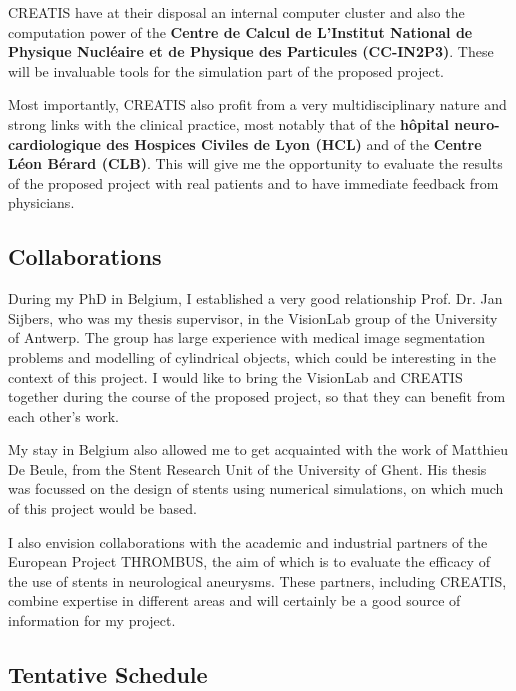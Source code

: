 \documentclass[a4paper]{article}
\begin{document}
CREATIS have at their disposal an internal computer cluster and also the computation power of the {\bf Centre de Calcul de L'Institut National de Physique Nucléaire et de Physique des Particules (CC-IN2P3)}. These will be invaluable tools for the simulation part of the proposed project. 

Most importantly, CREATIS also profit from a very multidisciplinary nature and strong links with the clinical practice, most notably that of the {\bf h\^opital neuro-cardiologique des Hospices Civiles de Lyon (HCL)} and of the {\bf Centre L\'eon B\'erard (CLB)}. This will give me the opportunity to evaluate the results of the proposed project with real patients and to have immediate feedback from physicians. 

\subsection{Collaborations}

During my PhD in Belgium, I established a very good relationship Prof. Dr. Jan Sijbers, who was my thesis supervisor, in the VisionLab group of the University of Antwerp. The group has large experience with medical image segmentation problems and modelling of cylindrical objects, which could be interesting in the context of this project. I would like to bring the VisionLab and CREATIS together during the course of the proposed project, so that they can benefit from each other's work.

My stay in Belgium also allowed me to get acquainted with the work of Matthieu De Beule, from the Stent Research Unit of the University of Ghent. His thesis was focussed on the design of stents using numerical simulations, on which much of this project would be based. 

I also envision collaborations with the academic and industrial partners of the European Project THROMBUS, the aim of which is to evaluate the efficacy of the use of stents in neurological aneurysms. These partners, including CREATIS, combine expertise in different areas and will certainly be a good source of information for my project.

\subsection{Tentative Schedule}
\end{document}
